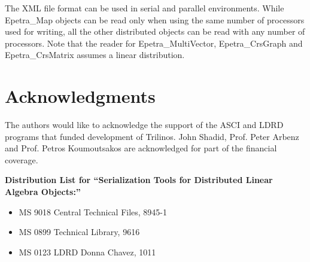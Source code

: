 \documentclass[11pt,relax]{SANDreport}
\begin{document}
The XML file format can be used in serial and parallel environments. While
Epetra\_Map objects can be read only when  using the same number of processors
used for writing, all the other distributed objects can be read with any
number of processors.  Note that the reader for Epetra\_MultiVector,
Epetra\_CrsGraph and Epetra\_CrsMatrix assumes a linear distribution. 

\section*{Acknowledgments}

The authors would like to acknowledge the support of the ASCI and LDRD programs
that funded development of Trilinos. John Shadid, Prof. Peter Arbenz and Prof.
Petros Koumoutsakos are acknowledged for part of the financial coverage.

\medskip




\newpage

\noindent
{\bf
Distribution List for ``Serialization Tools for Distributed Linear Algebra Objects:''
}

\begin{itemize}
\item MS 9018 Central Technical Files, 8945-1
\item MS 0899 Technical Library, 9616
\item MS 0123 LDRD Donna Chavez, 1011
\end{itemize}
\end{document}
